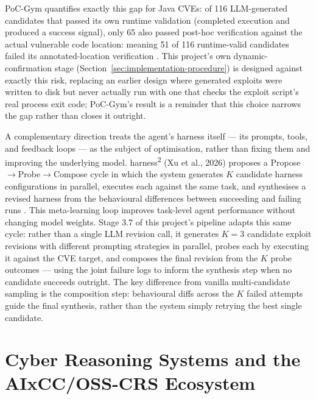 \documentclass[12pt,a4paper]{report}
\begin{document}
PoC-Gym quantifies exactly this gap for Java CVEs: of 116 LLM-generated candidates that passed its own runtime validation (completed execution and produced a success signal), only 65 also passed post-hoc verification against the actual vulnerable code location: meaning 51 of 116 runtime-valid candidates failed its annotated-location verification \cite{pocgym}. This project's own dynamic-confirmation stage (Section~\ref{sec:implementation-procedure}) is designed against exactly this risk, replacing an earlier design where generated exploits were written to disk but never actually run with one that checks the exploit script's real process exit code; PoC-Gym's result is a reminder that this choice narrows the gap rather than closes it outright.

A complementary direction treats the agent's harness itself --- its prompts, tools, and feedback loops --- as the subject of optimisation, rather than fixing them and improving the underlying model. harness\textsuperscript{2} (Xu et al., 2026) proposes a Propose$\to$Probe$\to$Compose cycle in which the system generates $K$ candidate harness configurations in parallel, executes each against the same task, and synthesises a revised harness from the behavioural differences between succeeding and failing runs \cite{harness2}. This meta-learning loop improves task-level agent performance without changing model weights. Stage 3.7 of this project's pipeline adapts this same cycle: rather than a single LLM revision call, it generates $K{=}3$ candidate exploit revisions with different prompting strategies in parallel, probes each by executing it against the CVE target, and composes the final revision from the $K$ probe outcomes --- using the joint failure logs to inform the synthesis step when no candidate succeeds outright. The key difference from vanilla multi-candidate sampling is the composition step: behavioural diffs across the $K$ failed attempts guide the final synthesis, rather than the system simply retrying the best single candidate.

\section{Cyber Reasoning Systems and the AIxCC/OSS-CRS Ecosystem}
\end{document}
